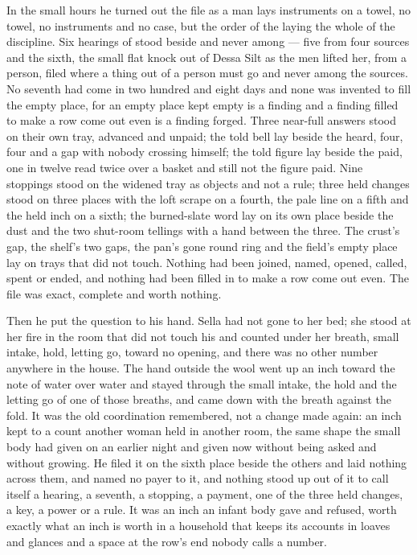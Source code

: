 In the small hours he turned out the file as a man lays instruments on a towel, no towel, no instruments and no case, but the order of the laying the whole of the discipline. Six hearings of  stood beside and never among --- five from four sources and the sixth, the small flat knock out of Dessa Silt as the men lifted her, from a person, filed where a thing out of a person must go and never among the sources. No seventh had come in two hundred and eight days and none was invented to fill the empty place, for an empty place kept empty is a finding and a finding filled to make a row come out even is a finding forged. Three near-full answers stood on their own tray, advanced and unpaid; the told bell lay beside the heard, four, four and a gap with nobody crossing himself; the told figure lay beside the paid, one in twelve read twice over a basket and still not the figure paid. Nine stoppings stood on the widened tray as objects and not a rule; three held changes stood on three places with the loft scrape on a fourth, the pale line on a fifth and the held inch on a sixth; the burned-slate word lay on its own place beside the dust and the two shut-room tellings with a hand between the three. The crust's gap, the shelf's two gaps, the pan's gone round ring and the field's empty place lay on trays that did not touch. Nothing had been joined, named, opened, called, spent or ended, and nothing had been filled in to make a row come out even. The file was exact, complete and worth nothing.

Then he put the question to his hand. Sella had not gone to her bed; she stood at her fire in the room that did not touch his and counted under her breath, small intake, hold, letting go, toward no opening, and there was no other number anywhere in the house. The hand outside the wool went up an inch toward the note of water over water and stayed through the small intake, the hold and the letting go of one of those breaths, and came down with the breath against the fold. It was the old coordination remembered, not a change made again: an inch kept to a count another woman held in another room, the same shape the small body had given on an earlier night and given now without being asked and without growing. He filed it on the sixth place beside the others and laid nothing across them, and named no payer to it, and nothing stood up out of it to call itself a hearing, a seventh, a stopping, a payment, one of the three held changes, a key, a power or a rule. It was an inch an infant body gave and refused, worth exactly what an inch is worth in a household that keeps its accounts in loaves and glances and a space at the row's end nobody calls a number.

